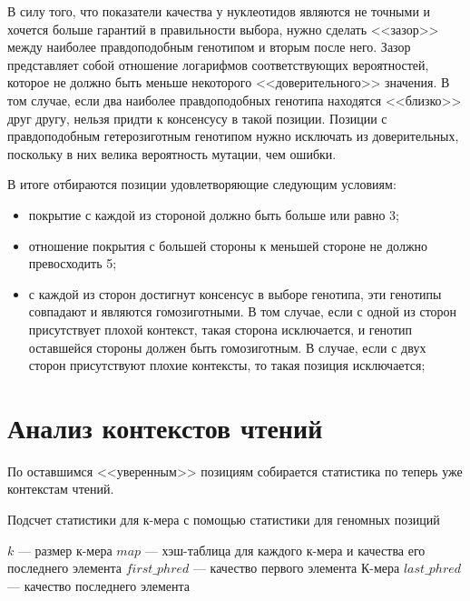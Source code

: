 В силу того, что показатели качества у нуклеотидов являются не точными и хочется больше гарантий в правильности выбора, нужно сделать <<зазор>> между наиболее правдоподобным генотипом и вторым после него. Зазор представляет собой отношение логарифмов соответствующих вероятностей, которое не должно быть меньше некоторого <<доверительного>> значения. В том случае, если два наиболее правдоподобных генотипа находятся <<близко>> друг другу, нельзя придти к консенсусу в такой позиции. Позиции с правдоподобным гетерозиготным генотипом нужно исключать из доверительных, поскольку в них велика вероятность мутации, чем ошибки.

В итоге отбираются позиции удовлетворяющие следующим условиям:
	\begin{itemize}
		\item покрытие с каждой из стороной должно быть больше или равно 3;
		\item отношение покрытия с большей стороны к меньшей стороне не должно превосходить 5;
		\item с каждой из сторон достигнут консенсус в выборе генотипа, эти генотипы совпадают и являются гомозиготными. В том случае, если с одной из сторон присутствует плохой контекст, такая сторона исключается, и генотип оставшейся стороны должен быть гомозиготным. В случае, если с двух сторон присутствуют плохие контексты, то такая позиция исключается;
	\end{itemize}

\section{Анализ контекстов чтений}

По оставшимся <<уверенным>> позициям собирается статистика по теперь уже контекстам чтений.

 	\begin{algorithm}[h!]
	\caption{Подсчет статистики для к-мера с помощью статистики для геномных позиций}
	\label{calcReadQmer}
	\begin{algorithmic}[1]
	\REQUIRE
		$k$ --- размер к-мера
		$map$ --- хэш-таблица для каждого к-мера и качества его последнего элемента
			\STATE $first\_phred$ --- {качество первого элемента К-мера}
			\STATE $last\_phred$ --- {качество последнего элемента}
			\ELSE 
			\ENDIF
		\ENDFOR
	\ENDFOR 
	\end{algorithmic}
	\end{algorithm}

